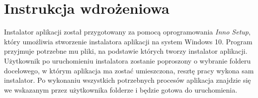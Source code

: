 \chapter{Instrukcja wdrożeniowa}

Instalator aplikacji został przygotowany za pomocą oprogramowania \emph{Inno Setup}, który umożliwia stworzenie instalatora aplikacji na system Windows 10. Program przyjmuje potrzebne mu pliki, na podstawie których tworzy instalator aplikacji. Użytkownik po uruchomieniu instalatora zostanie poproszony o wybranie folderu docelowego, w którym aplikacja ma zostać umieszczona, resztę pracy wykona sam instalator. Po wykonaniu wszystkich potrzebnych procesów aplikacja znajdzie się we wskazanym przez użytkownika folderze i będzie gotowa do uruchomienia.